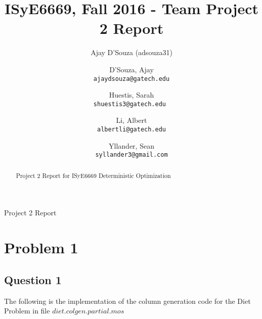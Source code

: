 \documentclass[twoside,12pt]{article}
\title{ISyE6669, Fall 2016 - Team Project 2 Report }
\author{Ajay D'Souza (adsouza31)}
\author{
  D'Souza, Ajay\\
  \texttt{ajaydsouza@gatech.edu}
  \and
  Huestis, Sarah\\
  \texttt{shuestis3@gatech.edu }
  \and
  Li, Albert\\
  \texttt{albertli@gatech.edu}
  \and
  Yllander, Sean\\
   \texttt{syllander3@gmail.com}
}
\date{}
\begin{document}
\maketitle
\begin{center}
Project 2 Report
\end{center}

\begin{abstract}
Project 2 Report for ISyE6669 Deterministic Optimization 
\end{abstract}
\pagebreak
\tableofcontents

\pagebreak
\listoffigures
\listoftables

\pagebreak



%
%
\section{Problem 1}
\label{p1}

\subsection{Question 1}
\label{p1_q1}

The following is the implementation of the column generation code for the Diet Problem in file $diet.colgen.partial.mos$\\\\
\end{document}
